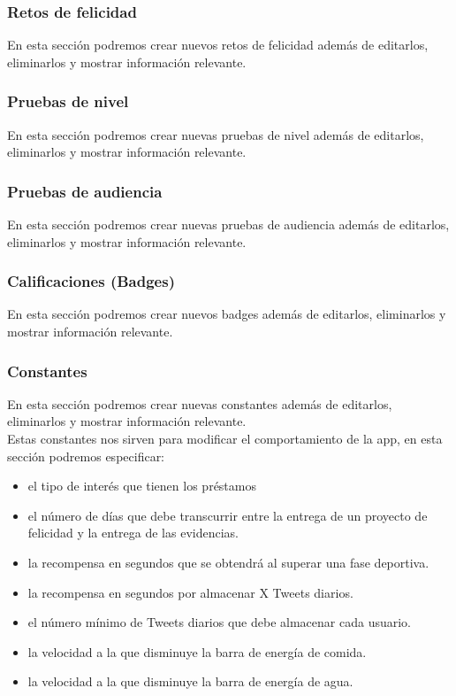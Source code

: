 \subsubsection{Retos de felicidad}
En esta sección podremos crear nuevos retos de felicidad además de editarlos, eliminarlos y mostrar información relevante.\\

\subsubsection{Pruebas de nivel}
En esta sección podremos crear nuevas pruebas de nivel además de editarlos, eliminarlos y mostrar información relevante.\\

\subsubsection{Pruebas de audiencia}
En esta sección podremos crear nuevas pruebas de audiencia además de editarlos, eliminarlos y mostrar información relevante.\\

\subsubsection{Calificaciones (Badges)}
En esta sección podremos crear nuevos badges además de editarlos, eliminarlos y mostrar información relevante.\\

\subsubsection{Constantes}
En esta sección podremos crear nuevas constantes además de editarlos, eliminarlos y mostrar información relevante.\\

Estas constantes nos sirven para modificar el comportamiento de la app, en esta sección podremos especificar: 

\begin{itemize}
	\item el tipo de interés que tienen los préstamos
	\item el número de días que debe transcurrir entre la entrega de un proyecto de felicidad y la entrega de las evidencias.
	\item la recompensa en segundos que se obtendrá al superar una fase deportiva.
	\item la recompensa en segundos por almacenar X Tweets diarios.
	\item el número mínimo de Tweets diarios que debe almacenar cada usuario.
	\item la velocidad a la que disminuye la barra de energía de comida.
	\item la velocidad a la que disminuye la barra de energía de agua.
\end{itemize}


